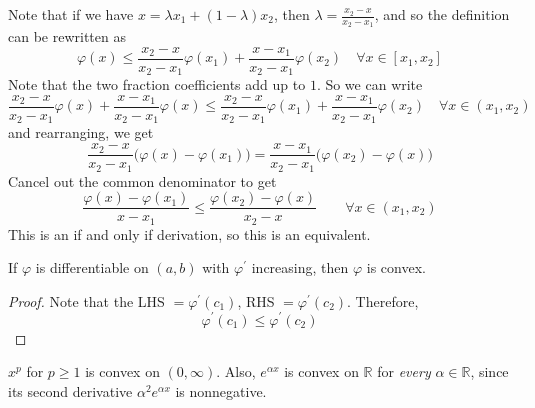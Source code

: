   Note that if we have $x = \lambda x_1 + (1 - \lambda) x_2$, then $\lambda = \frac{x_2 - x}{x_2 - x_1}$, and so the definition can be rewritten as 
  \begin{equation}
    \varphi(x) \leq \frac{x_2 - x}{x_2 - x_1} \varphi(x_1) + \frac{x - x_1}{x_2 - x_1} \varphi(x_2) \quad \forall x \in [x_1, x_2]
  \end{equation}
  Note that the two fraction coefficients add up to $1$. So we can write 
  \begin{equation}
    \frac{x_2 - x}{x_2 - x_1} \varphi(x) + \frac{x - x_1}{x_2 - x_1} \varphi(x)  \leq \frac{x_2 - x}{x_2 - x_1} \varphi(x_1) + \frac{x - x_1}{x_2 - x_1} \varphi(x_2) \quad \forall x \in (x_1, x_2)
  \end{equation}
  and rearranging, we get 
  \begin{equation}
    \frac{x_2 - x}{x_2 - x_1} \big( \varphi(x) - \varphi(x_1) \big) = \frac{x - x_1}{x_2 - x_1} \big( \varphi(x_2) - \varphi(x) \big)
  \end{equation} 
  Cancel out the common denominator to get 
  \begin{equation}
    \frac{\varphi(x) - \varphi(x_1)}{x - x_1} \leq \frac{\varphi(x_2) - \varphi(x)}{x_2 - x} \qquad \forall x \in (x_1, x_2)
  \end{equation}
  This is an if and only if derivation, so this is an equivalent. 

  \begin{theorem}
    \label{thm:increasing-derivative-implies-convexity}
    If $\varphi$ is differentiable on $(a, b)$ with $\varphi^\prime$ increasing, then $\varphi$ is convex. 
  \end{theorem}
  \begin{proof}
    Note that the LHS $= \varphi^\prime (c_1)$, RHS $= \varphi^\prime (c_2)$. Therefore, 
    \begin{equation}
      \varphi^\prime (c_1) \leq \varphi^\prime (c_2)
    \end{equation}
  \end{proof}

  \begin{example}
    \label{ex:convexity-of-xp-and-ealphax}
    $x^p$ for $p \geq 1$ is convex on $(0, \infty)$. Also, $e^{\alpha x}$ is convex on $\mathbb{R}$ for \textit{every} $\alpha \in \mathbb{R}$, since its second derivative $\alpha^2 e^{\alpha x}$ is nonnegative. 
  \end{example}

